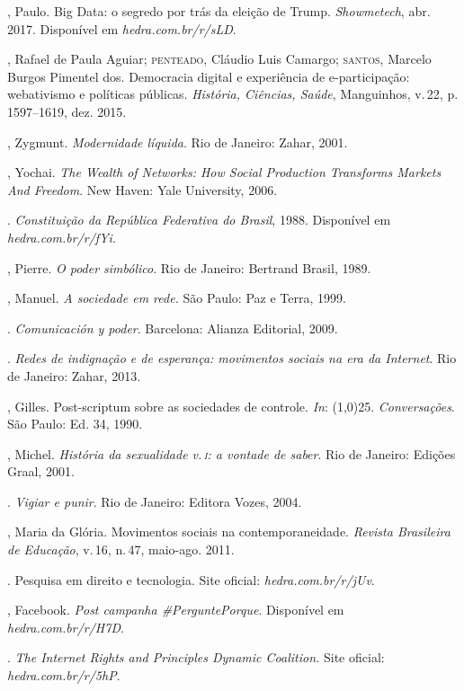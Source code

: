 \begin{bibliohedra}
, Paulo. Big Data: o segredo por trás da eleição de Trump. \textit{Showmetech}, abr. 2017. Disponível em \textit{hedra.com.br/r/sLD}.

, Rafael de Paula Aguiar; \textsc{penteado}, Cláudio Luis Camargo; \textsc{santos}, Marcelo Burgos Pimentel dos. Democracia digital e experiência de
e-participação: webativismo e políticas públicas. \textit{História, Ciências,
Saúde}, Manguinhos, v.\,22, p.\,1597--1619, dez. 2015.

, Zygmunt. \textit{Modernidade líquida}. Rio de Janeiro: Zahar, 2001.

, Yochai. \textit{The Wealth of Networks: How Social Production
Transforms Markets And Freedom}. New Haven: Yale University, 2006.

. \textit{Constituição da República
Federativa do Brasil}, 1988. Disponível em \textit{hedra.com.br/r/fYi}.

, Pierre. \textit{O poder simbólico}. Rio de Janeiro: Bertrand Brasil, 1989.

, Manuel. \textit{A sociedade em rede.} São Paulo: Paz e Terra,
1999.

\titidem. \textit{Comunicación y poder}. Barcelona: Alianza
Editorial, 2009.

\titidem. \textit{Redes de indignação e de esperança:
movimentos sociais na era da Internet}. Rio de Janeiro: Zahar, 2013.

, Gilles. Post-scriptum sobre as sociedades de controle. \textit{In}: \line(1,0){25}. \textit{Conversações}. São Paulo: Ed. 34, 1990.

, Michel. \textit{História da sexualidade v.\,\textsc{i}: a vontade de
saber}. Rio de Janeiro: Edições Graal, 2001.

\titidem. \textit{Vigiar e punir}. Rio de Janeiro: Editora Vozes, 2004.

, Maria da Glória. Movimentos sociais na contemporaneidade.
\textit{Revista Brasileira de Educação}, v.\,16, n.\,47, maio-ago. 2011.

. Pesquisa em direito e tecnologia. Site oficial: \textit{hedra.com.br/r/jUv}.

, Facebook. \textit{Post campanha \#PerguntePorque}.
Disponível em \textit{hedra.com.br/r/H7D}.

. \textit{The Internet Rights and Principles Dynamic
Coalition.} Site oficial: \textit{hedra.com.br/r/5hP}.


\end{bibliohedra}
